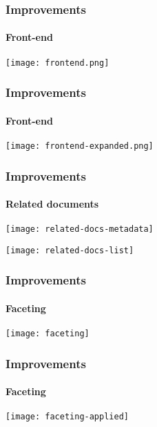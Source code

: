 \documentclass[table]{beamer}
\begin{document}
\begin{frame}
\frametitle{Improvements}
\framesubtitle{Front-end}

\centering
\texttt{[image: frontend.png]}

\end{frame}

\begin{frame}
\frametitle{Improvements}
\framesubtitle{Front-end}

\centering
\texttt{[image: frontend-expanded.png]}

\end{frame}

\begin{frame}
\frametitle{Improvements}
\framesubtitle{Related documents}

\centering

\begin{minipage}{0.30\textwidth}
    \centering
    \texttt{[image: related-docs-metadata]}
\end{minipage}
\hfill\vline\hfill
\begin{minipage}{0.67\textwidth}
    \centering
    \texttt{[image: related-docs-list]}
\end{minipage}

\end{frame}

\begin{frame}
\frametitle{Improvements}
\framesubtitle{Faceting}

\centering
\texttt{[image: faceting]}

\end{frame}

\begin{frame}
\frametitle{Improvements}
\framesubtitle{Faceting}

\centering
\texttt{[image: faceting-applied]}

\end{frame}
\end{document}
